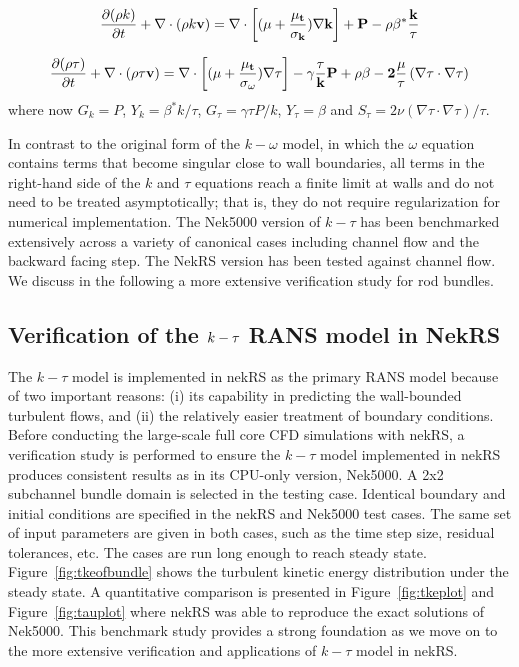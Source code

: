 \begin{equation}
    \frac{\partial (\rho k)}{\partial t} + \nabla\cdot(\rho k \bf{v}) =  \nabla\cdot\left[(\mu+\frac{\mu_t}{\sigma_k})\nabla k\right] + P-\rho \beta^{*}\frac{k}{\tau}
\end{equation}

\begin{equation}
 \frac{\partial (\rho \tau)}{\partial t} + \nabla\cdot(\rho\tau \bf{v}) =  \nabla\cdot\left[(\mu+\frac{\mu_t}{\sigma_\omega })\nabla \tau \right] - \gamma \frac{\tau}{k} P+\rho \beta-2\frac{\mu}{\tau}\left(\nabla\tau\cdot\nabla\tau\right)
\end{equation}
where now $G_k=P$, $Y_k=\beta^{*}k/\tau$, $G_\tau=\gamma\tau P/k$, $Y_\tau=\beta$ and $S_\tau=2\nu\left(\nabla\tau\cdot\nabla\tau\right)/\tau$.

In contrast to the original form of the $k-\omega$ model, in which the $\omega$ equation contains
terms that become singular close to  wall boundaries, all terms in the right-hand side of the $k$ and $\tau$ equations reach a finite  limit at walls and do not need to be treated  asymptotically; that is, they do not require regularization for numerical implementation. The Nek5000 version of  $k-\tau$ has been benchmarked extensively across a variety of canonical cases including channel flow and the backward facing step. The NekRS version has been tested against channel flow. We discuss in the following a more extensive verification study for rod bundles.

\subsection{Verification of the $\lowercase{k}-\tau$ RANS model in NekRS}
\label{sec:nrs1}
The $k-\tau$ model is implemented in nekRS as the primary RANS model because of two important reasons: (i) its capability in predicting the wall-bounded turbulent flows, and (ii) the relatively easier treatment of boundary conditions. Before conducting the large-scale full core CFD simulations with nekRS, a verification study is performed to ensure the $k-\tau$ model implemented in nekRS produces consistent results as in its CPU-only version, Nek5000. A 2x2 subchannel bundle domain is selected in the testing case. Identical boundary and initial conditions are specified in the nekRS and Nek5000 test cases. The same set of input parameters are given in both cases, such as the time step size, residual tolerances, etc. The cases are run long enough to reach steady state. Figure~\ref{fig:tkeofbundle} shows the turbulent kinetic energy distribution under the steady state. A quantitative comparison is presented in Figure~\ref{fig:tkeplot} and Figure~\ref{fig:tauplot} where nekRS was able to reproduce the exact solutions of Nek5000. This benchmark study provides a strong foundation as we move on to the more extensive verification and applications of $k-\tau$ model in nekRS.


